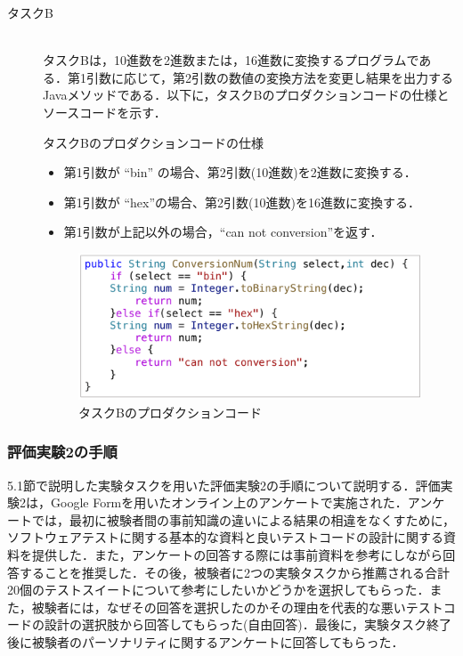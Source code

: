 \documentclass[12pt]{jarticle} %
\begin{document}
\begin{description}
\item[タスクB]~\\
タスクBは，10進数を2進数または，16進数に変換するプログラムである．第1引数に応じて，第2引数の数値の変換方法を変更し結果を出力するJavaメソッドである．以下に，タスクBのプロダクションコードの仕様とソースコードを示す．


\begin{itembox}[l]{タスクBのプロダクションコードの仕様}
\begin{itemize}
\item 第1引数が ``bin'' の場合、第2引数(10進数)を2進数に変換する．
\item 第1引数が ``hex''の場合、第2引数(10進数)を16進数に変換する．
\item 第1引数が上記以外の場合，``can not conversion''を返す．
\end{itemize}
\end{itembox}

\begin{figure}[htbp]
  \begin{center}
    \includegraphics[clip,width=12cm]{taskB.pdf}
    \caption{タスクBのプロダクションコード}
    \label{E2}
  \end{center}
\end{figure}

\end{description}

\subsubsection{評価実験2の手順}

5.1節で説明した実験タスクを用いた評価実験2の手順について説明する．評価実験2は，Google Formを用いたオンライン上のアンケートで実施された．アンケートでは，最初に被験者間の事前知識の違いによる結果の相違をなくすために，ソフトウェアテストに関する基本的な資料と良いテストコードの設計に関する資料を提供した．また，アンケートの回答する際には事前資料を参考にしながら回答することを推奨した．その後，被験者に2つの実験タスクから推薦される合計20個のテストスイートについて参考にしたいかどうかを選択してもらった．また，被験者には，なぜその回答を選択したのかその理由を代表的な悪いテストコードの設計の選択肢から回答してもらった(自由回答)．最後に，実験タスク終了後に被験者のパーソナリティに関するアンケートに回答してもらった．
\end{document}
